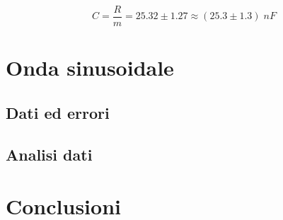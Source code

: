 \documentclass[11pt, a4paper]{article}
\numberwithin{equation}{section} %
\begin{document}
\begin{equation}
    C = \frac{R}{m} = 25.32 \pm 1.27 \approx (25.3 \pm 1.3) \; \unit{nF}
\end{equation}

\section{Onda sinusoidale}

\subsection{Dati ed errori}

\subsection{Analisi dati}

\section{Conclusioni}
\end{document}
